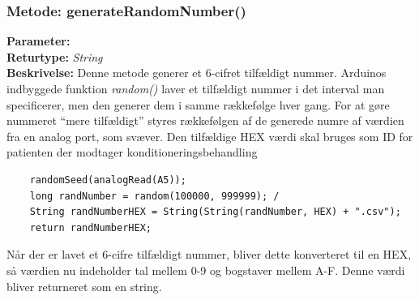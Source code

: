 \subsubsection{Metode: generateRandomNumber()} \label{title:RandomNumber}
\textbf{Parameter: } 
\\ \textbf{Returtype: } \textit{String}
\\ \textbf{Beskrivelse: }  Denne metode generer et 6-cifret tilfældigt nummer. Arduinos indbyggede funktion \textit{random()} laver et tilfældigt nummer i det interval man specificerer, men den generer dem i samme rækkefølge hver gang. For at gøre nummeret “mere tilfældigt” styres rækkefølgen af de generede numre af værdien fra en analog port, som svæver. Den tilfældige HEX værdi skal bruges som ID for patienten der modtager konditioneringsbehandling 
\begin{lstlisting}
	randomSeed(analogRead(A5)); 
	long randNumber = random(100000, 999999); /
	String randNumberHEX = String(String(randNumber, HEX) +	".csv");
	return randNumberHEX; 
\end{lstlisting}
Når der er lavet et 6-cifre tilfældigt nummer, bliver dette konverteret til en HEX, så værdien nu indeholder tal mellem 0-9 og bogstaver mellem A-F. Denne værdi bliver returneret som en string. 


